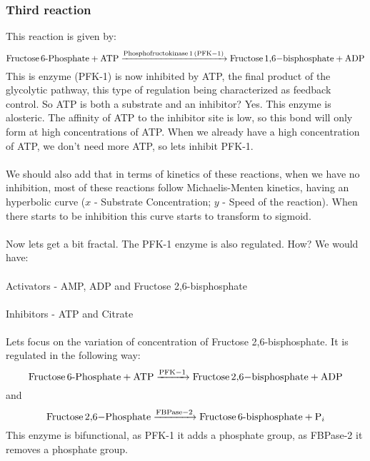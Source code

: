\documentclass[12pt,  letterpaper]{article}
\begin{document}
\paragraph*{}
\subsubsection*{Third reaction}
This reaction is given by:
\begin{equation}
\ce{Fructose 6-Phosphate + ATP ->[Phosphofructokinase 1 (PFK-1)] Fructose 1,6-bisphosphate + ADP}
\end{equation}
This is enzyme (PFK-1) is now inhibited by ATP, the final product of the glycolytic pathway, this type of regulation being characterized as feedback control. So ATP is both a substrate and an inhibitor? Yes. This enzyme is alosteric. The affinity of ATP to the inhibitor site is low, so this bond will only form at high concentrations of ATP. When we already have a high concentration of ATP, we don't need more ATP, so lets inhibit PFK-1.
\paragraph*{}
We should also add that in terms of kinetics of these reactions, when we have no inhibition, most of these reactions follow Michaelis-Menten kinetics, having an hyperbolic curve ($x$ - Substrate Concentration; $y$ - Speed of the reaction). When there starts to be inhibition this curve starts to transform to sigmoid.
\paragraph*{}
Now lets get a bit fractal. The PFK-1 enzyme is also regulated. How? We would have:
\paragraph*{}
Activators - AMP, ADP and Fructose 2,6-bisphosphate
\paragraph*{}
Inhibitors - ATP and Citrate
\paragraph*{}
Lets focus on the variation of concentration of Fructose 2,6-bisphosphate. It is regulated in the following way:
\begin{equation}
\ce{Fructose 6-Phosphate + ATP ->[PFK-1] Fructose 2,6-bisphosphate + ADP}
\end{equation}
and
\begin{equation}
\ce{Fructose 2,6-Phosphate ->[FBPase-2] Fructose 6-bisphosphate + P_{i}}
\end{equation}
This enzyme is bifunctional, as PFK-1 it adds a phosphate group, as FBPase-2 it removes a phosphate group.
\end{document}
